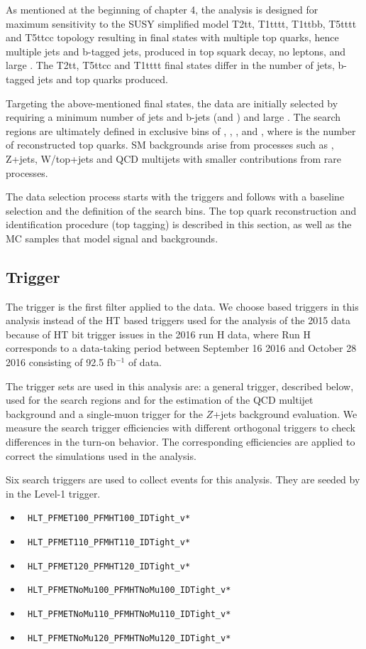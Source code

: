 As mentioned at the beginning of chapter 4, the analysis is designed for maximum sensitivity to the SUSY simplified model T2tt, T1tttt, T1ttbb, T5tttt and T5ttcc topology resulting in final states with multiple top quarks, hence multiple jets and b-tagged jets, produced in top squark decay, no leptons, and large \MET. The T2tt, T5ttcc and T1tttt final states differ in the number of jets, b-tagged jets and top quarks produced. 

Targeting the above-mentioned final states, the data are initially selected by requiring a minimum number of jets and b-jets (\njets and \nbjets) and large \MET. The search regions are ultimately defined in exclusive bins of \ntops, \nbjets, \HT, \MET and \MTTwo, where \ntops is the number of reconstructed top quarks. SM backgrounds arise from processes such as \ttbar, Z+jets, W/top+jets and QCD multijets with smaller contributions from rare processes.

The data selection process starts with the triggers and follows with a baseline selection and the definition of the search bins. The top quark reconstruction and identification procedure (top tagging) is described in this section, as well as the MC samples that model signal and backgrounds.

\subsection{Trigger}
\label{sec:trig}

The trigger is the first filter applied to the data. We choose \MET based triggers in this analysis instead of the HT based triggers used for the analysis of the 2015 data because of HT bit trigger issues in the 2016 run H data, where Run H corresponds to a data-taking period between September 16 2016 and October 28 2016 consisting of 92.5 fb$^{-1}$ of data. 

The trigger sets are used in this analysis are: a general trigger, described below, used for the search regions and for the estimation of the QCD multijet background and a single-muon trigger for the $Z$+jets background evaluation. We measure the search trigger efficiencies with different orthogonal triggers to check differences in the turn-on behavior. The corresponding efficiencies are applied to correct the simulations used in the analysis.

Six search triggers are used to collect events for this analysis. They are seeded by \MET in the Level-1 trigger. 
\begin{itemize}
\item \texttt{ HLT\_PFMET100\_PFMHT100\_IDTight\_v*}
\item \texttt{ HLT\_PFMET110\_PFMHT110\_IDTight\_v*}
\item \texttt{ HLT\_PFMET120\_PFMHT120\_IDTight\_v*}
\item \texttt{ HLT\_PFMETNoMu100\_PFMHTNoMu100\_IDTight\_v*} 
\item \texttt{ HLT\_PFMETNoMu110\_PFMHTNoMu110\_IDTight\_v* }
\item \texttt{ HLT\_PFMETNoMu120\_PFMHTNoMu120\_IDTight\_v*}
\end{itemize}

